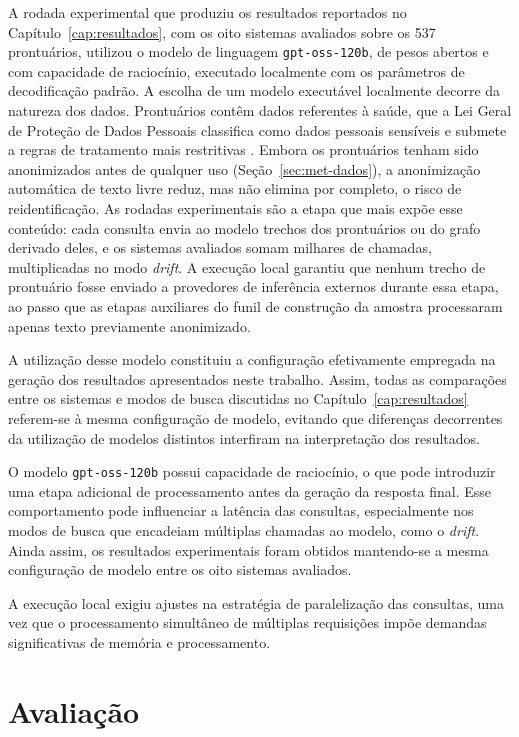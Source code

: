 A rodada experimental que produziu os resultados reportados no Capítulo~\ref{cap:resultados}, com os oito sistemas avaliados sobre os 537 prontuários, utilizou o modelo de linguagem \texttt{gpt-oss-120b}, de pesos abertos e com capacidade de raciocínio, executado localmente com os parâmetros de decodificação padrão. A escolha de um modelo executável localmente decorre da natureza dos dados. Prontuários contêm dados referentes à saúde, que a Lei Geral de Proteção de Dados Pessoais classifica como dados pessoais sensíveis e submete a regras de tratamento mais restritivas \citep{brasil2018lgpd}. Embora os prontuários tenham sido anonimizados antes de qualquer uso (Seção~\ref{sec:met-dados}), a anonimização automática de texto livre reduz, mas não elimina por completo, o risco de reidentificação. As rodadas experimentais são a etapa que mais expõe esse conteúdo: cada consulta envia ao modelo trechos dos prontuários ou do grafo derivado deles, e os sistemas avaliados somam milhares de chamadas, multiplicadas no modo \textit{drift}. A execução local garantiu que nenhum trecho de prontuário fosse enviado a provedores de inferência externos durante essa etapa, ao passo que as etapas auxiliares do funil de construção da amostra processaram apenas texto previamente anonimizado.

A utilização desse modelo constituiu a configuração efetivamente empregada na geração dos resultados apresentados neste trabalho. Assim, todas as comparações entre os sistemas e modos de busca discutidas no Capítulo~\ref{cap:resultados} referem-se à mesma configuração de modelo, evitando que diferenças decorrentes da utilização de modelos distintos interfiram na interpretação dos resultados.

O modelo \texttt{gpt-oss-120b} possui capacidade de raciocínio, o que pode introduzir uma etapa adicional de processamento antes da geração da resposta final. Esse comportamento pode influenciar a latência das consultas, especialmente nos modos de busca que encadeiam múltiplas chamadas ao modelo, como o \textit{drift}. Ainda assim, os resultados experimentais foram obtidos mantendo-se a mesma configuração de modelo entre os oito sistemas avaliados.

A execução local exigiu ajustes na estratégia de paralelização das consultas, uma vez que o processamento simultâneo de múltiplas requisições impõe demandas significativas de memória e processamento.

\section{Avaliação}\label{sec:met-avaliacao}

